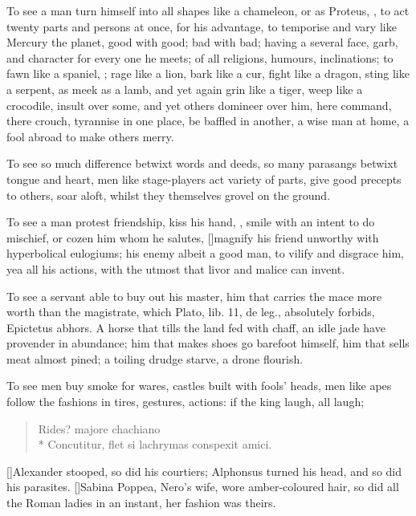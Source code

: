 {To see a man turn himself into all shapes like a chameleon, or as
Proteus, , to act twenty parts
and persons at once, for his advantage, to temporise and vary like
Mercury the planet, good with good; bad with bad; having a several
face, garb, and character for every one he meets; of all religions,
humours, inclinations; to fawn like a spaniel, ; rage like a lion, bark like a cur, fight like a dragon, sting
like a serpent, as meek as a lamb, and yet again grin like a tiger,
weep like a crocodile, insult over some, and yet others domineer over
him, here command, there crouch, tyrannise in one place, be baffled in
another, a wise man at home, a fool abroad to make others merry.

To see so much difference betwixt words and deeds, so many parasangs
betwixt tongue and heart, men like stage-players act variety of parts,
give good precepts to others, soar aloft, whilst they themselves
grovel on the ground.

To see a man protest friendship, kiss his hand, , smile with an intent to do mischief, or cozen
him whom he salutes, [\baselineskip]magnify his friend unworthy with hyperbolical
eulogiums; his enemy albeit a good man, to vilify and disgrace him, yea
all his actions, with the utmost that livor and malice can invent.

To see a servant able to buy out his master, him that carries the
mace more worth than the magistrate, which Plato, lib. 11, de leg.,
absolutely forbids, Epictetus abhors. A horse that tills the land
fed with chaff, an idle jade have provender in abundance; him that
makes shoes go barefoot himself, him that sells meat almost pined; a
toiling drudge starve, a drone flourish.

To see men buy smoke for wares, castles built with fools' heads, men
like apes follow the fashions in tires, gestures, actions: if the king
laugh, all laugh;

\begin{verse}
\textlatin{Rides? majore chachiano}\\*
\textlatin{Concutitur, flet si lachrymas conspexit amici.}
\end{verse}

[\baselineskip]Alexander stooped, so did his courtiers; Alphonsus turned his
head, and so did his parasites. [\baselineskip]Sabina Poppea, Nero's wife, wore
amber-coloured hair, so did all the Roman ladies in an instant, her
fashion was theirs.

}
